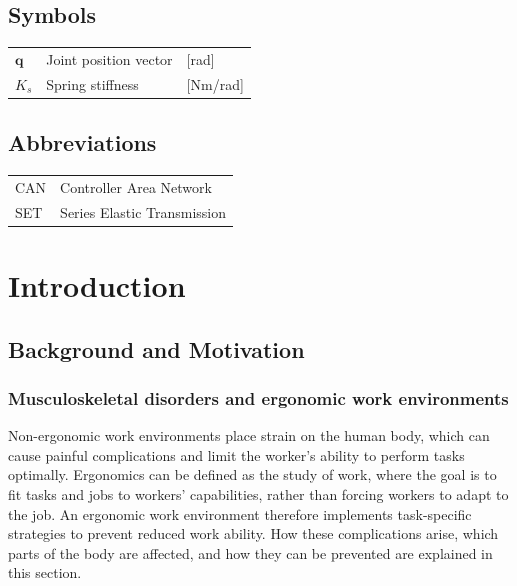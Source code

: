 \documentclass[11pt,a4paper,twoside,openright]{book}
\begin{document}
\section*{Symbols}
\begin{tabular}{@{}lll@{}}
  $\bm{q}$    & Joint position vector  & [rad]    \\
  $K_s$       & Spring stiffness       & [Nm/rad] \\
\end{tabular}

\vspace{1cm}
\section*{Abbreviations}
\begin{tabular}{@{}ll@{}}
  CAN  & Controller Area Network \\
  SET  & Series Elastic Transmission \\
\end{tabular}

\cleardoublepage


\mainmatter

\chapter{Introduction}
\label{ch:introduction}

\section{Background and Motivation}

\subsection{Musculoskeletal disorders and ergonomic work environments}

Non-ergonomic work environments place strain on the human body, which can cause painful complications and limit the worker’s ability to perform tasks optimally. Ergonomics can be defined as the study of work, where the goal is to fit tasks and jobs to workers’ capabilities, rather than forcing workers to adapt to the job. An ergonomic work environment therefore implements task-specific strategies to prevent reduced work ability. How these complications arise, which parts of the body are affected, and how they can be prevented are explained in this section. 
\end{document}
